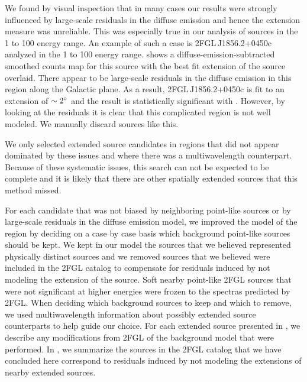 We found by visual inspection that in many
cases our results were strongly influenced by large-scale residuals in the
diffuse emission and hence the extension measure was unreliable.  This was
especially true in our analysis of sources in the 1 \gev to 100 \gev
energy range.  An example of such a case is 2FGL\,J1856.2+0450c analyzed
in the 1 \gev to 100 \gev energy range. 
shows a diffuse-emission-subtracted smoothed counts map for
this source with the best
fit extension of the source overlaid. There appear to be large-scale
residuals in the diffuse emission in this region along the Galactic plane.
As a result, 2FGL\,J1856.2+0450c is fit to an extension of $\sim2^\circ$
and the result is statistically significant with . However,
by looking at the residuals it is clear that this complicated region is
not well modeled. We manually discard sources like this.

We only selected extended source
candidates in regions that did not appear dominated by these issues and
where there was a multiwavelength
counterpart. Because of these systematic issues, this search can not be
expected to be complete and it is likely that there are other spatially
extended sources that this method missed.



For each candidate that was not biased by neighboring point-like
sources or by large-scale residuals in the diffuse emission model, we
improved the model of the region by deciding on a case by case basis which
background point-like sources should be kept.  We kept in our model the
sources that we
believed represented physically distinct sources and we removed 
sources that we believed were included in the 2FGL catalog to compensate
for residuals induced by not modeling the extension of the source.
Soft nearby point-like 2FGL sources that were not significant at higher energies
were frozen to the spectras predicted by 2FGL.
When deciding
which background sources to keep and which to remove, we used 
multiwavelength information about possibly extended source counterparts
to help guide our choice. For each extended source presented in 
, we describe any modifications from 2FGL
of the background model that were performed.
In , we summarize the sources in
the 2FGL catalog that we have concluded here correspond to residuals
induced by not modeling the extensions of nearby extended sources.

